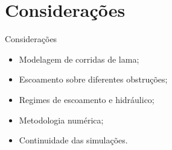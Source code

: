 \section{Considerações}

\begin{frame}
    \begin{exampleblock}{Considerações}
        \begin{itemize}
            \item Modelagem de corridas de lama;
            \item Escoamento sobre diferentes obstruções;
            \item Regimes de escoamento e hidráulico;
            \item Metodologia numérica;
            \item Continuidade das simulações.
        \end{itemize}        
    \end{exampleblock}
\end{frame}